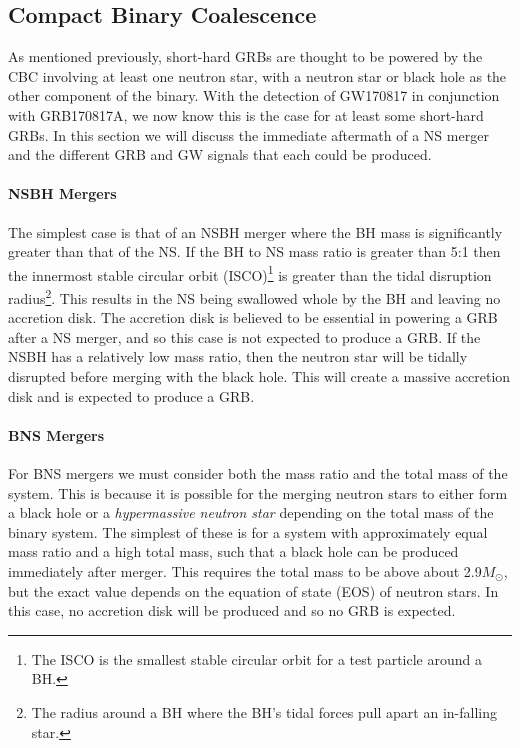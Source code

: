 \documentclass[11pt]{cuthesis}
\begin{document}
\subsection{Compact Binary Coalescence}
As mentioned previously, short-hard GRBs are thought to be powered by the CBC involving at least one neutron star, with a neutron star or black hole as the other component of the binary. With the detection of GW170817 in conjunction with GRB170817A, we now know this is the case for at least some short-hard GRBs. In this section we will discuss the immediate aftermath of a NS merger and the different GRB and GW signals that each could be produced.

\paragraph{NSBH Mergers} The simplest case is that of an NSBH merger where the BH mass is significantly greater than that of the NS. If the BH to NS mass ratio is greater than 5:1 then the innermost stable circular orbit (ISCO)\footnote{The ISCO is the smallest stable circular orbit for a test particle around a BH.} is greater than the tidal disruption radius\footnote{The radius around a BH where the BH's tidal forces pull apart an in-falling star.}. This results in the NS being swallowed whole by the BH and leaving no accretion disk. The accretion disk is believed to be essential in powering a GRB after a NS merger, and so this case is not expected to produce a GRB. If the NSBH has a relatively low mass ratio, then the neutron star will be tidally disrupted before merging with the black hole. This will create a massive accretion disk and is expected to produce a GRB. 

\paragraph{BNS Mergers} For BNS mergers we must consider both the mass ratio and the total mass of the system. This is because it is possible for the merging neutron stars to either form a black hole or a \textit{hypermassive neutron star} depending on the total mass of the binary system. The simplest of these is for a system with approximately equal mass ratio and a high total mass, such that a black hole can be produced immediately after merger. This requires the total mass to be above about 2.9$M_\odot$\cite{gw_grb_paradigm}, but the exact value depends on the equation of state (EOS) of neutron stars. In this case, no accretion disk will be produced and so no GRB is expected. 
\end{document}
